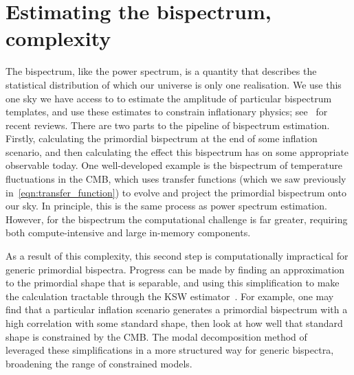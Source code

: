     \section{Estimating the bispectrum, complexity}
    The bispectrum, like the power spectrum, is a quantity that describes
the statistical distribution of which our universe is only one realisation.
We use this one sky we have access to to estimate the amplitude of
particular bispectrum templates,
and use these estimates to constrain inflationary physics; 
see~\cite{astro2020_features,astro2020_png} for recent reviews.
There are two parts to the pipeline of bispectrum estimation.
Firstly, calculating the primordial bispectrum at the end of some inflation scenario,
and then calculating the effect this bispectrum
has on some appropriate observable today.
One well-developed example is
the bispectrum of temperature fluctuations in the CMB, which uses transfer functions
(which we saw previously in~\eqref{eqn:transfer_function})
to evolve and project the primordial bispectrum onto our sky.
In principle, this is the same process as power spectrum estimation.
However, for the bispectrum the computational challenge is far greater,
requiring both compute-intensive and large in-memory components.


As a result of this complexity, this second step is computationally impractical for generic primordial bispectra.
Progress can be made by finding an approximation to the primordial shape
that is separable, and using this simplification
to make the calculation tractable
through the KSW estimator~\cite{Komatsu_2005, Munchmeyer_2014}.
For example, one may find that a particular inflation scenario generates
a primordial bispectrum with a high correlation with some standard shape,
then look at how well that standard shape is constrained by the CMB.
The modal decomposition method of~\cite{FergShell_1,FergShell_2,FergShell_3}
leveraged these simplifications in a more structured way
for generic bispectra, broadening the range of constrained models.


